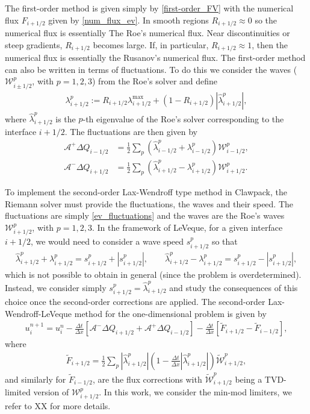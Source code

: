 \documentclass[preprint, 11pt]{article}
\newcommand{\W}{{\mathcal W}}
\newcommand{\A}{{\mathcal A}}
\begin{document}
The first-order method is given simply by \eqref{first-order_FV} 
with the numerical flux $F_{i+1/2}$ given by \eqref{num_flux_ev}. 
In smooth regions $R_{i+1/2}\approx 0$ so the numerical flux is essentially The Roe's numerical flux. 
Near discontinuities or steep gradients, $R_{i+1/2}$ becomes large. If, in particular, $R_{i+1/2}\approx 1$, 
then the numerical flux is essentially the Rusanov's numerical flux.  
%
The first-order method can also be written in terms of fluctuations. 
To do this we consider the waves ($\W^p_{i\pm 1/2}$, with $p=1,2,3$) 
from the Roe's solver and define 
\begin{align}
  \lambda_{i+1/2}^p := R_{i+1/2}\lambda_{i+1/2}^{\max} + (1-R_{i+1/2})|\hat \lambda_{i+1/2}^p|,
\end{align}
where $\hat\lambda_{i+1/2}^p$ is the $p$-th eigenvalue of the Roe's solver corresponding to the 
interface $i+1/2$. The fluctuations are then given by 
\begin{subequations}\label{ev_fluctuations}
\begin{align}
  \A^+\Delta Q_{i-1/2}&=\frac{1}{2}\sum_p \left(\hat\lambda_{i-1/2}^p + \lambda_{i-1/2}^p\right)\W_{i-1/2}^p, \\
  \A^-\Delta Q_{i+1/2}&=\frac{1}{2}\sum_p \left(\hat\lambda_{i+1/2}^p - \lambda_{i+1/2}^p\right)\W_{i+1/2}^p.
\end{align}
\end{subequations}

To implement the second-order Lax-Wendroff type method in Clawpack, the Riemann solver must provide 
the fluctuations, the waves and their speed. The fluctuations are simply \eqref{ev_fluctuations} 
and the waves are the Roe's waves $\W_{i+1/2}^p$, with $p=1,2,3$. 
In the framework of LeVeque, for a given interface $i+1/2$, 
we would need to consider a wave speed $s_{i+1/2}^p$ so that 
\begin{align*}
  \hat \lambda_{i+1/2}^p+\lambda_{i+1/2}^p = s_{i+1/2}^p+|s_{i+1/2}^p|, \qquad 
  \hat \lambda_{i+1/2}^p-\lambda_{i+1/2}^p = s_{i+1/2}^p-|s_{i+1/2}^p|,
\end{align*}
which is not possible to obtain in general (since the problem is overdetermined). Instead, we consider 
simply $s_{i+1/2}^p=\hat\lambda_{i+1/2}^p$ and study the consequences of this choice 
once the second-order corrections are applied.
The second-order Lax-Wendroff-LeVeque method for the one-dimensional problem is given by 
\begin{align}\label{second-order}
  u_i^{n+1}=u_i^n
  -\frac{\Delta t}{\Delta x}\left[\A^-\Delta Q_{i+1/2}+\A^+\Delta Q_{i-1/2}\right]
  -\frac{\Delta t}{\Delta x}\left[\tilde F_{i+1/2}-\tilde F_{i-1/2}\right],
\end{align}
where 
\begin{align*}
  \tilde F_{i+1/2} = \frac{1}{2}\sum_p|\hat\lambda_{i+1/2}^p|
  \left(1-\frac{\Delta t}{\Delta x}|\hat\lambda_{i+1/2}^p|\right)\tilde\W_{i+1/2}^p,
\end{align*}
and similarly for $\tilde F_{i-1/2}$, are the flux corrections with $\tilde\W_{i+1/2}^p$ 
being a TVD-limited version of $\W_{i+1/2}^p$. 
In this work, we consider the min-mod limiters, we refer to XX for more details. 
\end{document}
